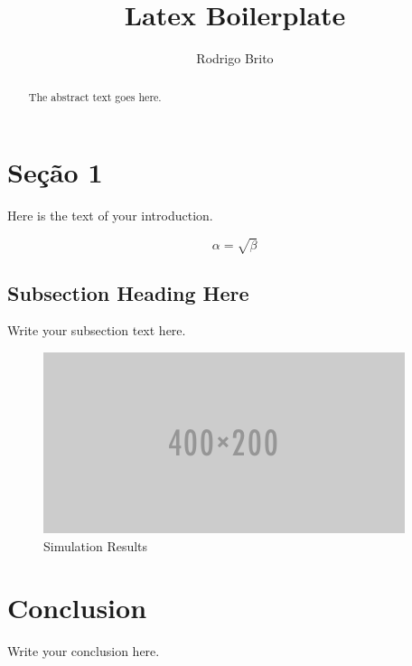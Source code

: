 \documentclass{article}
\begin{document}
\title{Latex Boilerplate}
\author{Rodrigo Brito}

\maketitle

\begin{abstract}
The abstract text goes here.
\end{abstract}

\section{Seção 1}
Here is the text of your introduction.

\begin{equation}
    \label{simple_equation}
    \alpha = \sqrt{ \beta }
\end{equation}

\subsection{Subsection Heading Here}
Write your subsection text here.

\begin{figure}[!htp]
    \centering
    \includegraphics[width=0.9\linewidth]{fig/image.png}
    \caption{Simulation Results}
    \label{simulationfigure}
\end{figure}

\section{Conclusion}
Write your conclusion here.
\end{document}

